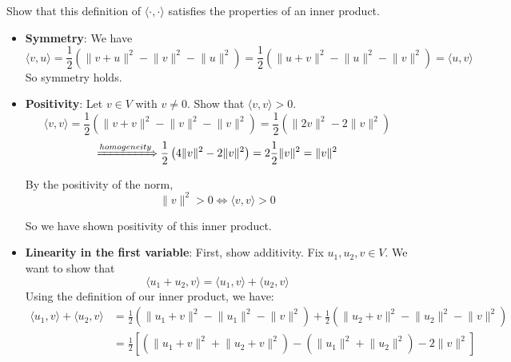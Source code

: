 \documentclass[12pt]{article}
\begin{document}
\begin{enumerate}[label=\alph*)]
\begin{itemize}
        Show that this definition of $\langle \cdot, \cdot \rangle$ satisfies the properties of an inner product.
        \begin{itemize}
            \item \textbf{Symmetry}: We have
            $$
                \langle v, u \rangle = \frac{1}{2}\left(\lVert v + u \rVert^2 - \lVert v \rVert^2 - \lVert u \rVert^2\right) = \frac{1}{2}\left(\lVert u + v \rVert^2 - \lVert u \rVert^2 - \lVert v \rVert^2\right) = \langle u, v \rangle
            $$
            So symmetry holds.
            \item \textbf{Positivity}: Let $v \in V$ with $v \neq 0$. Show that $\langle v, v \rangle > 0$.
            $$
                \langle v, v \rangle = \frac{1}{2}\left(\lVert v + v \rVert^2 - \lVert v \rVert^2 - \lVert v \rVert^2\right) = \frac{1}{2}\left(\lVert 2 v \rVert^2 - 2 \lVert v \rVert^2\right)
            $$
            $$
                \xRightarrow{homogeneity} \frac{1}{2}\left(4 \lVert v \rVert^2 - 2 \lVert v \rVert^2\right) = 2 \frac{1}{2} \lVert v \rVert^2 = \lVert v \rVert^2
            $$

            By the positivity of the norm, 
            $$
                \lVert v \rVert^2 > 0 \iff \langle v, v \rangle > 0
            $$

            So we have shown positivity of this inner product.
            \item \textbf{Linearity in the first variable}: First, show additivity. Fix $u_1, u_2, v \in V$. We want to show that
            $$
                \langle u_1 + u_2, v \rangle = \langle u_1, v \rangle + \langle u_2, v \rangle
            $$
            Using the definition of our inner product, we have:
            $$
            \begin{aligned}
                \langle u_1, v \rangle + \langle u_2, v \rangle &= \frac{1}{2} \left( \lVert u_1 + v \rVert^2 - \lVert u_1 \rVert^2 - \lVert v \rVert^2 \right)
                + \frac{1}{2} \left( \lVert u_2 + v \rVert^2 - \lVert u_2 \rVert^2 - \lVert v \rVert^2 \right) \\
                &= \frac{1}{2} \left[ \left( \lVert u_1 + v \rVert^2 + \lVert u_2 + v \rVert^2 \right) - \left( \lVert u_1 \rVert^2 + \lVert u_2 \rVert^2 \right) - 2\lVert v \rVert^2 \right]
            \end{aligned}
            $$


\end{itemize}
\end{itemize}
\end{enumerate}
\end{document}
